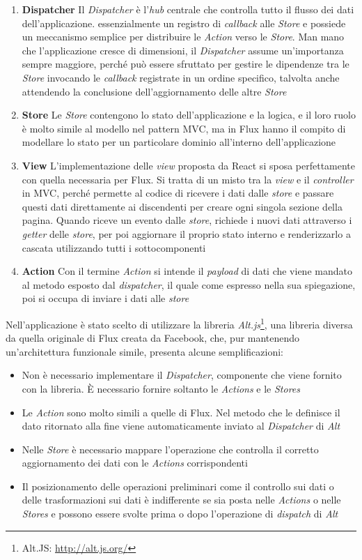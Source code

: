 \begin{enumerate}
	\item \textbf{Dispatcher}
	Il \emph{Dispatcher} è l'\emph{hub} centrale che controlla tutto il flusso dei dati dell'applicazione. \upe essenzialmente un registro di \emph{callback} alle \emph{Store} e possiede un meccanismo semplice per distribuire le \emph{Action} verso le \emph{Store}. Man mano che l'applicazione cresce di dimensioni, il \emph{Dispatcher} assume un'importanza sempre maggiore, perché può essere sfruttato per gestire le dipendenze tra le \emph{Store} invocando le \emph{callback} registrate in un ordine specifico, talvolta anche attendendo la conclusione dell'aggiornamento delle altre \emph{Store} 
	\item \textbf{Store}
	Le \emph{Store} contengono lo stato dell'applicazione e la logica, e il loro ruolo è molto simile al modello nel pattern MVC, ma in Flux hanno il compito di modellare lo stato per un particolare dominio all'interno dell'applicazione
	\item \textbf{View}
	L'implementazione delle \emph{view} proposta da React si sposa perfettamente con quella necessaria per Flux. Si tratta di un misto tra la \emph{view} e il \emph{controller} in MVC, perché permette al codice di ricevere i dati dalle \emph{store} e passare questi dati direttamente ai discendenti per creare ogni singola sezione della pagina. Quando riceve un evento dalle \emph{store}, richiede i nuovi dati attraverso i \emph{getter} delle \emph{store}, per poi aggiornare il proprio stato interno e renderizzarlo a cascata utilizzando tutti i sottocomponenti
	\item \textbf{Action}
	Con il termine \emph{Action} si intende il \emph{payload} di dati che viene mandato al metodo esposto dal \emph{dispatcher}, il quale come espresso nella sua spiegazione, poi si occupa di inviare i dati alle \emph{store}
\end{enumerate} 

Nell'applicazione è stato scelto di utilizzare la libreria \emph{Alt.js}\footnote{Alt.JS: \url{http://alt.js.org/}}, una libreria diversa da quella originale di Flux creata da Facebook, che, pur mantenendo un'ar\-chi\-tet\-tu\-ra funzionale simile, presenta alcune semplificazioni:

\begin{itemize}
	\item
	Non è necessario implementare il \emph{Dispatcher}, componente che viene fornito con la libreria. È necessario fornire soltanto le \emph{Actions}  e le \emph{Stores}
	\item
	Le \emph{Action} sono molto simili a quelle di Flux. Nel metodo che le definisce il dato ritornato alla fine viene automaticamente inviato al \emph{Dispatcher} di \emph{Alt}
	\item
	Nelle \emph{Store} è necessario mappare l'operazione che controlla il corretto aggiornamento dei dati con le \emph{Actions} corrispondenti
	\item
	Il posizionamento delle operazioni preliminari come il controllo sui dati o delle trasformazioni sui dati è indifferente se sia posta nelle \emph{Actions} o nelle \emph{Stores} e possono essere svolte prima o dopo l'operazione di \emph{dispatch} di \emph{Alt}
\end{itemize}